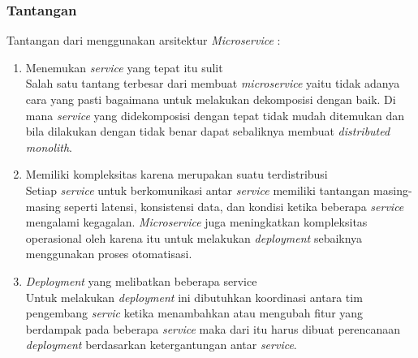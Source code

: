 \subsubsection{Tantangan}
Tantangan dari menggunakan arsitektur \textit{Microservice}  \cite{ECD,74C,1C7}:
\begin{enumerate}[leftmargin=1.3cm]
	\item Menemukan \textit{service} yang tepat itu sulit\\
	Salah satu tantang terbesar dari membuat \textit{microservice} yaitu tidak adanya cara yang pasti bagaimana untuk melakukan dekomposisi dengan baik. Di mana \textit{service} yang didekomposisi dengan tepat tidak mudah ditemukan dan bila dilakukan dengan tidak benar dapat sebaliknya membuat \textit{distributed monolith}. 
	\item Memiliki kompleksitas karena merupakan suatu terdistribusi\\
	Setiap \textit{service} untuk berkomunikasi antar \textit{service} memiliki tantangan masing-masing seperti latensi, konsistensi data, dan kondisi ketika beberapa \textit{service} mengalami kegagalan. \textit{Microservice} juga meningkatkan kompleksitas operasional oleh karena itu untuk melakukan \textit{deployment} sebaiknya menggunakan proses otomatisasi.
	\item \textit{Deployment} yang melibatkan beberapa service\\
	Untuk melakukan \textit{deployment} ini dibutuhkan koordinasi antara tim pengembang \textit{servic} ketika menambahkan atau mengubah fitur yang berdampak pada beberapa \textit{service} maka dari itu harus dibuat perencanaan \textit{deployment} berdasarkan ketergantungan antar \textit{service}.
\end{enumerate}	

